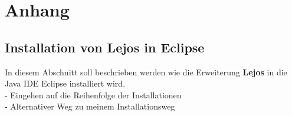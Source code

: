 \chapter{Anhang}
\section{Installation von Lejos in Eclipse}
In diesem Abschnitt soll beschrieben werden wie die Erweiterung \textbf{Lejos} in die Java IDE Eclipse installiert wird.\\ 
- Eingehen auf die Reihenfolge der Installationen\\
- Alternativer Weg zu meinem Installationsweg \\